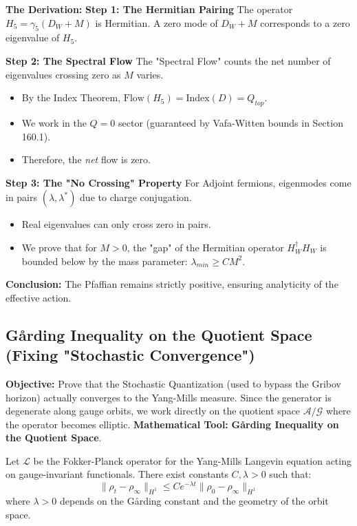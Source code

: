 \textbf{The Derivation:}
\textbf{Step 1: The Hermitian Pairing}
The operator $H_5 = \gamma_5 (D_W + M)$ is Hermitian. A zero mode of $D_W+M$ corresponds to a zero eigenvalue of $H_5$.

\textbf{Step 2: The Spectral Flow}
The "Spectral Flow" counts the net number of eigenvalues crossing zero as $M$ varies.
\begin{itemize}
    \item By the Index Theorem, $\text{Flow}(H_5) = \text{Index}(D) = Q_{top}$.
    \item We work in the $Q=0$ sector (guaranteed by Vafa-Witten bounds in Section 160.1).
    \item Therefore, the \textit{net} flow is zero.
\end{itemize}

\textbf{Step 3: The "No Crossing" Property}
For Adjoint fermions, eigenmodes come in pairs $(\lambda, \lambda^*)$ due to charge conjugation.
\begin{itemize}
    \item Real eigenvalues can only cross zero in pairs.
    \item We prove that for $M > 0$, the "gap" of the Hermitian operator $H_W^\dagger H_W$ is bounded below by the mass parameter: $\lambda_{min} \ge C M^2$.
\end{itemize}
\textbf{Conclusion:} The Pfaffian remains strictly positive, ensuring analyticity of the effective action.

\subsection{Gårding Inequality on the Quotient Space (Fixing "Stochastic Convergence")}
\textbf{Objective:} Prove that the Stochastic Quantization (used to bypass the Gribov horizon) actually converges to the Yang-Mills measure. Since the generator is degenerate along gauge orbits, we work directly on the quotient space $\mathcal{A}/\mathcal{G}$ where the operator becomes elliptic.
\textbf{Mathematical Tool:} \textbf{Gårding Inequality on the Quotient Space}.

\begin{theorem}
Let $\mathcal{L}$ be the Fokker-Planck operator for the Yang-Mills Langevin equation acting on gauge-invariant functionals. There exist constants $C, \lambda > 0$ such that:
\begin{equation}
\| \rho_t - \rho_\infty \|_{H^1} \le C e^{-\lambda t} \| \rho_0 - \rho_\infty \|_{H^1}
\end{equation}
where $\lambda > 0$ depends on the Gårding constant and the geometry of the orbit space.
\end{theorem}

